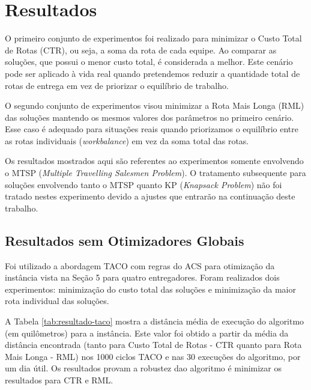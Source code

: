 \chapter{Resultados}


O primeiro conjunto de experimentos foi realizado para minimizar o Custo Total de Rotas (CTR), ou seja, a soma da rota de cada equipe. Ao comparar as soluções, que possui o menor custo total, é considerada a melhor. Este cenário pode ser aplicado à vida real quando pretendemos reduzir a quantidade total de rotas de entrega em vez de priorizar o equilíbrio de trabalho.

O segundo conjunto de experimentos visou minimizar a Rota Mais Longa (RML) das soluções mantendo os mesmos valores dos parâmetros no primeiro cenário. Esse caso é adequado para situações reais quando priorizamos o equilíbrio entre as rotas individuais (\textit{workbalance}) em vez da soma total das rotas.

Os resultados mostrados aqui são referentes ao experimentos somente envolvendo o MTSP (\textit{Multiple Travelling Salesmen Problem}). O tratamento subsequente para soluções envolvendo tanto o MTSP quanto KP (\textit{Knapsack Problem}) não foi tratado nestes experimento devido a ajustes que entrarão na continuação deste trabalho.

\section{Resultados sem Otimizadores Globais}
\label{sec-resultados-taco}

Foi utilizado a abordagem TACO com regras do ACS para otimização da instância vista na Seção 5 para quatro entregadores. Foram realizados dois experimentos: minimização do custo total das soluções e minimização da maior rota individual das soluções.

A Tabela \ref{tab:resultado-taco} mostra a distância média de execução do algoritmo (em quilômetros) para a instância. Este valor foi obtido a partir da média da distância encontrada (tanto para Custo Total de Rotas - CTR quanto para Rota Mais Longa - RML) nos 1000 ciclos TACO e nas 30 execuções do algoritmo, por um dia útil. Os resultados provam a robustez dao algoritmo é minimizar os resultados para CTR e RML.

